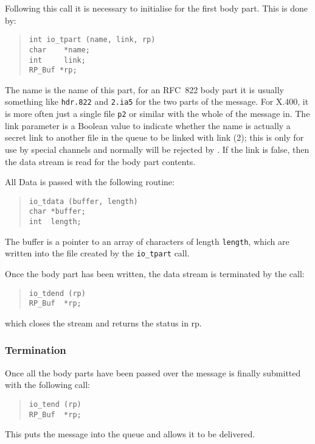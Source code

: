 Following this call it is necessary to initialise for the first body
part.  This is done by:
\begin{quote}\begin{verbatim}
int io_tpart (name, link, rp)
char    *name;
int     link;
RP_Buf *rp;
\end{verbatim}\end{quote}
The name is the name of this part, for an RFC~822 body part it is
usually something like \verb|hdr.822| and \verb|2.ia5| for the two
parts of the message.  For X.400, it is more often just a single file
\verb|p2| or similar with the whole of the message in. The link
parameter is a Boolean value to indicate whether the name is actually
a secret link to another file in the queue to be linked with \man
link (2); this is only for use by special channels and normally will be
rejected by . If the link is false, then the data stream
is read for the body part contents.

All Data is passed with the following routine:
\begin{quote}\begin{verbatim}
io_tdata (buffer, length)
char *buffer;
int  length;
\end{verbatim}\end{quote}
The buffer is a pointer to an array of characters of length \verb|length|,
which are written into the file created by the \verb|io_tpart| call.

Once the body part has been written, the
data stream is terminated by the call:
\begin{quote}\begin{verbatim}
io_tdend (rp)
RP_Buf  *rp;
\end{verbatim}\end{quote}
which closes the stream and returns the status in rp.

\subsubsection{Termination}

Once all the body parts have been passed over the message is finally
submitted with the following call:
\begin{quote}\begin{verbatim}
io_tend (rp)
RP_Buf  *rp;
\end{verbatim}\end{quote}
This puts the message into the queue and allows it to be delivered.


